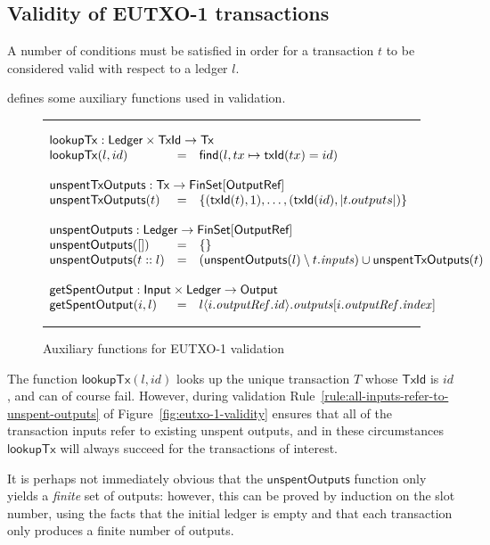\documentclass[a4paper]{article}
\newcommand{\s}{\textsf}  %
\newcommand{\msf}[1]{\ensuremath{\mathsf{#1}}}
\newcommand{\mi}[1]{\ensuremath{\mathit{#1}}}
\newcommand\rfskip{7pt}
\newenvironment{ruledfigure}[1]{\begin{figure}[#1]\hrule\vspace{\rfskip}}{\vspace{\rfskip}\hrule\end{figure}}
\newcommand{\FinSet}[1]{\ensuremath{\s{FinSet}[#1]}}
\newcommand{\TxId}{\ensuremath{\s{TxId}}}
\newcommand{\txId}{\msf{txId}}
\newcommand{\idx}{\mi{index}}
\newcommand{\inputs}{\mi{inputs}}
\newcommand{\outputs}{\mi{outputs}}
\newcommand{\outputref}{\mi{outputRef}}
\newcommand{\id}{\mi{id}}
\newcommand{\lookupTx}{\msf{lookupTx}}
\newcommand{\getSpent}{\msf{getSpentOutput}}
\newcommand{\unspent}{\msf{unspentOutputs}}
\newcommand{\txunspent}{\msf{unspentTxOutputs}}
\newcommand{\eutxotx}{\msf{Tx}}
\newcommand{\emptymap}{\ensuremath{\{\}}}
\begin{document}
\subsection{Validity of EUTXO-1 transactions}
\label{sec:eutxo-1-validity}
A number of conditions must be satisfied in order for a transaction
$t$ to be considered valid with respect to a ledger $l$.

 defines some auxiliary functions used in validation.
\begin{ruledfigure}{H}
  \begin{displaymath}
  \begin{array}{lll}
  \multicolumn{3}{l}{\lookupTx : \s{Ledger} \times \TxId \rightarrow \eutxotx{}}\\
  \lookupTx(l,id) &=& \textsf{find}(l, tx \mapsto \txId(tx) = id)\\
  \\
  \multicolumn{3}{l}{\txunspent : \eutxotx \rightarrow \FinSet{\s{OutputRef}}}\\
  \txunspent(t) &=& \{(\txId(t),1), \ldots, (\txId(id),\left|t.outputs\right|)\}\\
  \\
  \multicolumn{3}{l}{\unspent : \s{Ledger} \rightarrow \FinSet{\s{OutputRef}}}\\
  \unspent([]) &=& \emptymap \\
  \unspent(t::l) &=& (\unspent(l) \setminus t.\inputs) \cup \txunspent(t)\\
  \\
  \multicolumn{3}{l}{\getSpent : \s{Input} \times \s{Ledger} \rightarrow \s{Output}}\\
  \getSpent(i,l) &=& l\langle i.\outputref.\id \rangle.\outputs[i.\outputref.\idx]
  \end{array}
  \end{displaymath}
  \caption{Auxiliary functions for EUTXO-1 validation}
  \label{fig:validation-functions-1}
\end{ruledfigure}

\noindent The function $\lookupTx(l,id)$ looks up the unique
transaction $T$ whose $\TxId$ is $id$, and can of course
fail. However, during validation
Rule~\ref{rule:all-inputs-refer-to-unspent-outputs} of
Figure~\ref{fig:eutxo-1-validity} ensures that all of the transaction
inputs refer to existing unspent outputs, and in these circumstances
$\lookupTx$ will always succeed for the transactions of interest.

It is perhaps not immediately obvious that the $\unspent$ function
only yields a \textit{finite} set of outputs: however, this can be
proved by induction on the slot number, using the facts that the
initial ledger is empty and that each transaction only produces a
finite number of outputs.
\end{document}
